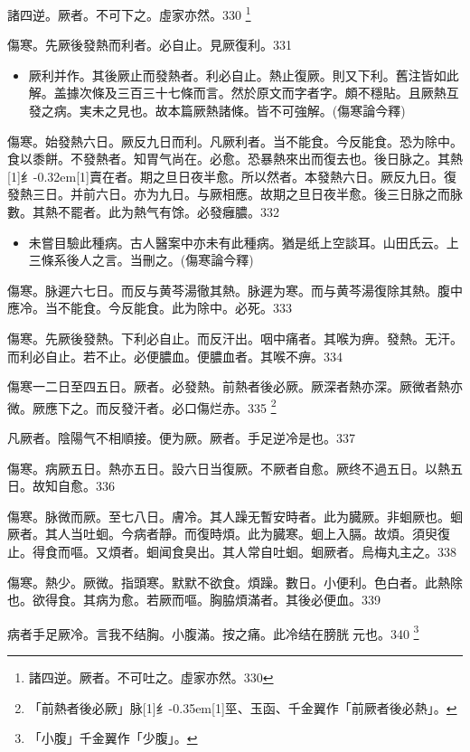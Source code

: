 \documentclass[oneside,b4paper]{ctexbook}
\begin{document}
\begin{flushleft}
諸四逆。厥者。不可下之。虛家亦然。330
\footnote{諸四逆。厥者。不可吐之。虛家亦然。330}

傷寒。先厥後發熱而利者。必自止。見厥復利。331

\begin{itemize}
\item 厥利并作。其後厥止而發熱者。利必自止。熱止復厥。則又下利。舊注皆如此解。盖據次條及三百三十七條而言。然於原文而字者字。頗不穩貼。且厥熱互發之病。実未之見也。故本篇厥熱諸條。皆不可強解。(傷寒論今釋)
\end{itemize}

傷寒。始發熱六日。厥反九日而利。凡厥利者。当不能食。今反能食。恐为除中。食以黍餅。不發熱者。知胃气尚在。必愈。恐暴熱來出而復去也。後日脉之。其熱{\hbox{\scalebox{0.6}[1]{纟}\kern-0.32em\scalebox{0.7}[1]{賣}}}在者。期之旦日夜半愈。所以然者。本發熱六日。厥反九日。復發熱三日。并前六日。亦为九日。与厥相應。故期之旦日夜半愈。後三日脉之而脉數。其熱不罷者。此为熱气有馀。必發癰膿。332

\begin{itemize}
\item 未嘗目驗此種病。古人醫案中亦未有此種病。猶是纸上空談耳。山田氏云。上三條系後人之言。当刪之。(傷寒論今釋)
\end{itemize}

傷寒。脉遲六七日。而反与黄芩湯徹其熱。脉遲为寒。而与黄芩湯復除其熱。腹中應冷。当不能食。今反能食。此为除中。必死。333

傷寒。先厥後發熱。下利必自止。而反汗出。咽中痛者。其喉为痹。發熱。无汗。而利必自止。若不止。必便膿血。便膿血者。其喉不痹。334

傷寒一二日至四五日。厥者。必發熱。前熱者後必厥。厥深者熱亦深。厥微者熱亦微。厥應下之。而反發汗者。必口傷烂赤。335
\footnote{「前熱者後必厥」脉{\hbox{\scalebox{0.68}[1]{纟}\kern-0.35em\scalebox{0.64}[1]{巠}}}、玉函、千金翼作「前厥者後必熱」。}

凡厥者。陰陽气不相順接。便为厥。厥者。手足逆冷是也。337

傷寒。病厥五日。熱亦五日。設六日当復厥。不厥者自愈。厥终不過五日。以熱五日。故知自愈。336

傷寒。脉微而厥。至七八日。膚冷。其人躁无暫安時者。此为臓厥。非蛔厥也。蛔厥者。其人当吐蛔。今病者靜。而復時煩。此为臓寒。蛔上入膈。故煩。須臾復止。得食而嘔。又煩者。蛔闻食臭出。其人常自吐蛔。蛔厥者。烏梅丸主之。338

傷寒。熱少。厥微。指頭寒。默默不欲食。煩躁。數日。小便利。色白者。此熱除也。欲得食。其病为愈。若厥而嘔。胸脇煩滿者。其後必便血。339

病者手足厥冷。言我不结胸。小腹滿。按之痛。此冷结在膀胱{𬮦}元也。340
\footnote{「小腹」千金翼作「少腹」。}


\end{flushleft}
\end{document}
